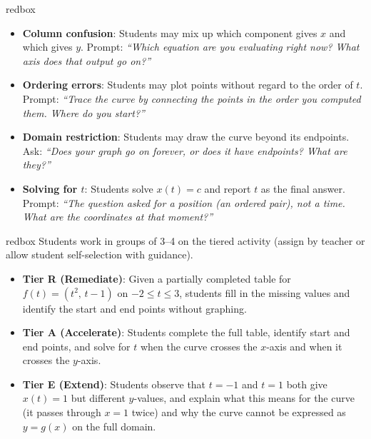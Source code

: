 \documentclass[10pt]{article}
\begin{document}
\vspace{0.08in}

\begin{skillbox}{redbox}
\begin{itemize}[leftmargin=1.4em, itemsep=3pt]
  \item \textbf{Column confusion}: Students may mix up which component
    gives $x$ and which gives $y$. Prompt: \textit{``Which equation are
    you evaluating right now? What axis does that output go on?''}
  \item \textbf{Ordering errors}: Students may plot points without
    regard to the order of $t$. Prompt: \textit{``Trace the curve by
    connecting the points in the order you computed them. Where do you
    start?''}
  \item \textbf{Domain restriction}: Students may draw the curve beyond
    its endpoints. Ask: \textit{``Does your graph go on forever, or
    does it have endpoints? What are they?''}
  \item \textbf{Solving for $t$}: Students solve $x(t) = c$ and report
    $t$ as the final answer. Prompt: \textit{``The question asked for a
    \emph{position} (an ordered pair), not a time. What are the
    coordinates at that moment?''}
\end{itemize}
\end{skillbox}

\vspace{0.08in}

\begin{skillbox}{redbox}
Students work in groups of 3--4 on the tiered activity (assign by
teacher or allow student self-selection with guidance).

\begin{itemize}[leftmargin=1.4em, itemsep=4pt]
  \item \textbf{Tier R (Remediate)}: Given a partially completed table
    for $f(t) = (t^2,\, t-1)$ on $-2 \le t \le 3$, students fill in
    the missing values and identify the start and end points without
    graphing.
  \item \textbf{Tier A (Accelerate)}: Students complete the full table,
    identify start and end points, and solve for $t$ when the curve
    crosses the $x$-axis and when it crosses the $y$-axis.
  \item \textbf{Tier E (Extend)}: Students observe that $t = -1$ and
    $t = 1$ both give $x(t) = 1$ but different $y$-values, and explain
    what this means for the curve (it passes through $x = 1$ twice)
    and why the curve cannot be expressed as $y = g(x)$ on the full
    domain.
\end{itemize}
\end{skillbox}
\end{document}
